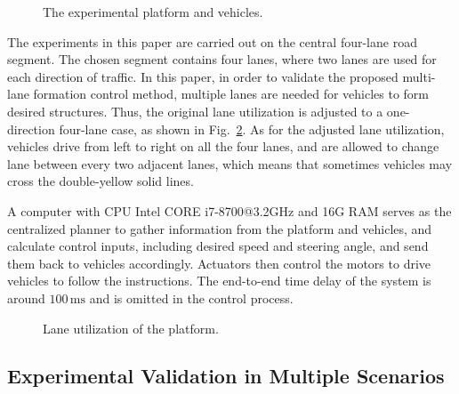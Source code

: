 \documentclass[journal]{IEEEtranTIE}
\begin{document}
\begin{figure}
\begin{center}
    \caption{The experimental platform and vehicles. }
    \label{platformfig}
\end{center}
\end{figure}

The experiments in this paper are carried out on the central four-lane road segment. The chosen segment contains four lanes, where two lanes are used for each direction of traffic. In this paper, in order to validate the proposed multi-lane formation control method, multiple lanes are needed for vehicles to form desired structures. Thus, the original lane utilization is adjusted to a one-direction four-lane case, as shown in Fig.~\ref{laneutilization}. As for the adjusted lane utilization, vehicles drive from left to right on all the four lanes, and are allowed to change lane between every two adjacent lanes, which means that sometimes vehicles may cross the double-yellow solid lines.

A computer with CPU Intel CORE i7-8700@3.2GHz and 16G RAM serves as the centralized planner to gather information from the platform and vehicles, and calculate control inputs, including desired speed and steering angle, and send them back to vehicles accordingly. Actuators then control the motors to drive vehicles to follow the instructions. The end-to-end time delay of the system is around $100\,\mathrm{ms}$ and is omitted in the control process.


\begin{figure}
\begin{center}
    \caption{Lane utilization of the platform. }
    \label{laneutilization}
\end{center}
\end{figure}



%
\subsection{Experimental Validation in Multiple Scenarios}
\label{vali}
%
\end{document}
